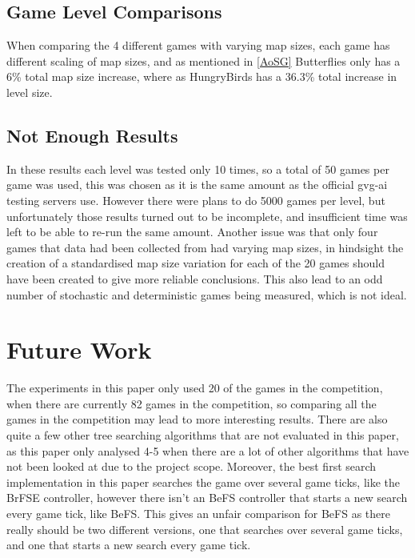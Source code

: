 \documentclass[journal]{IEEEtran}
\begin{document}
	\subsection{Game Level Comparisons}
		When comparing the 4 different games with varying map sizes, each game has different scaling of map sizes, and as mentioned in \ref{AoSG} Butterflies only has a 6\% total map size increase, where as HungryBirds has a 36.3\% total increase in level size.

	\subsection{Not Enough Results}
		In these results each level was tested only 10 times, so a total of 50 games per game was used, this was chosen as it is the same amount as the official gvg-ai testing servers use. However there were plans to do 5000 games per level, but unfortunately those results turned out to be incomplete, and insufficient time was left to be able to re-run the same amount. 
		Another issue was that only four games that data had been collected from had varying map sizes, in hindsight the creation of a standardised map size variation for each of the 20 games should have been created to give more reliable conclusions.
		This also lead to an odd number of stochastic and deterministic games being measured, which is not ideal.







\section{Future Work}

The experiments in this paper only used 20 of the games in the competition, when there are currently 82 games in the competition, so comparing all the games in the competition may lead to more interesting results.
There are also quite a few other tree searching algorithms that are not evaluated in this paper, as this paper only analysed 4-5 when there are a lot of other algorithms that have not been looked at due to the project scope.
Moreover, the best first search implementation in this paper searches the game over several game ticks, like the BrFSE controller, however there isn't an BeFS controller that starts a new search every game tick, like BeFS. This gives an unfair comparison for BeFS as there really should be two different versions, one that searches over several game ticks, and one that starts a new search every game tick.
\end{document}
